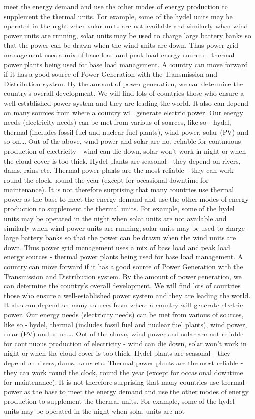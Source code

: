 \documentclass[10pt, a4paper]{article}
\begin{document}
meet the energy demand and use the other modes of energy production to supplement the thermal units. For example, some of the hydel units may be operated in the night when solar units are not available and similarly when wind power units are running, solar units may be used to charge large battery banks so that the power can be drawn when the wind units are down. Thus power grid management uses a mix of base load and peak load energy sources - thermal power plants being used for base load management. A country can move forward if it has a good source of Power Generation with the Transmission and Distribution system. By the amount of power generation, we can determine the country’s overall development. We will find lots of countries those who ensure a well-established power system and they are leading the world. It also can depend on many sources from where a country will generate electric power. Our energy needs (electricity needs) can be met from various of sources, like so - hydel, thermal (includes fossil fuel and nuclear fuel plants), wind power, solar (PV) and so on\dots. Out of the above, wind power and solar are not reliable for continuous production of electricity - wind can die down, solar won’t work in night or when the cloud cover is too thick. Hydel plants are seasonal - they depend on rivers, dams, rains etc. Thermal power plants are the most reliable - they can work round the clock, round the year (except for occasional downtime for maintenance). It is not therefore surprising that many countries use thermal power as the base to meet the energy demand and use the other modes of energy production to supplement the thermal units. For example, some of the hydel units may be operated in the night when solar units are not available and similarly when wind power units are running, solar units may be used to charge large battery banks so that the power can be drawn when the wind units are down. Thus power grid management uses a mix of base load and peak load energy sources - thermal power plants being used for base load management. A country can move forward if it has a good source of Power Generation with the Transmission and Distribution system. By the amount of power generation, we can determine the country’s overall development. We will find lots of countries those who ensure a well-established power system and they are leading the world. It also can depend on many sources from where a country will generate electric power. Our energy needs (electricity needs) can be met from various of sources, like so - hydel, thermal (includes fossil fuel and nuclear fuel plants), wind power, solar (PV) and so on\dots. Out of the above, wind power and solar are not reliable for continuous production of electricity - wind can die down, solar won’t work in night or when the cloud cover is too thick. Hydel plants are seasonal - they depend on rivers, dams, rains etc. Thermal power plants are the most reliable - they can work round the clock, round the year (except for occasional downtime for maintenance). It is not therefore surprising that many countries use thermal power as the base to meet the energy demand and use the other modes of energy production to supplement the thermal units. For example, some of the hydel units may be operated in the night when solar units are not 
\end{document}
